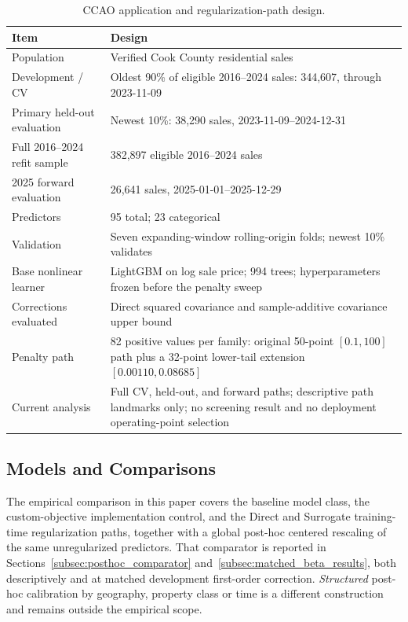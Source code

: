 \documentclass[10pt]{article}
\theoremstyle{definition}
\newcommand{\1}{\mathbf{1}}
\begin{document}
\begin{table}[t]
\centering
\caption{
CCAO application and regularization-path design.}
\label{tab:ccao_design}
\begin{tabularx}{\textwidth}{@{}p{3.5cm}X@{}}
\toprule
Item & Design \\
\midrule
Population & Verified Cook County residential sales \\
Development / CV & Oldest 90\% of eligible 2016--2024 sales: 344,607, through 2023-11-09 \\
Primary held-out evaluation & Newest 10\%: 38,290 sales, 2023-11-09--2024-12-31 \\
Full 2016--2024 refit sample & 382,897 eligible 2016--2024 sales \\
2025 forward evaluation & 26,641 sales, 2025-01-01--2025-12-29 \\
Predictors & 95 total; 23 categorical \\
Validation & Seven expanding-window rolling-origin folds; newest 10\% validates \\
Base nonlinear learner & LightGBM on log sale price; 994 trees; hyperparameters frozen before the penalty sweep \\
Corrections evaluated & Direct squared covariance and sample-additive covariance upper bound \\
Penalty path & 82 positive values per family: original 50-point $[0.1,100]$ path plus a 32-point lower-tail extension $[0.00110,0.08685]$ \\
Current analysis & Full CV, held-out, and forward paths; descriptive path landmarks only; no screening result and no deployment operating-point selection \\
\bottomrule
\end{tabularx}
\end{table}


\subsection{Models and Comparisons}
\label{subsec:comparators}

The empirical comparison in this paper covers the baseline model class, the custom-objective implementation control, and the Direct and Surrogate training-time regularization paths, together with a global post-hoc centered rescaling of the same unregularized predictors. That comparator is reported in Sections~\ref{subsec:posthoc_comparator} and~\ref{subsec:matched_beta_results}, both descriptively and at matched development first-order correction. \emph{Structured} post-hoc calibration by geography, property class or time is a different construction and remains outside the empirical scope.
\end{document}
